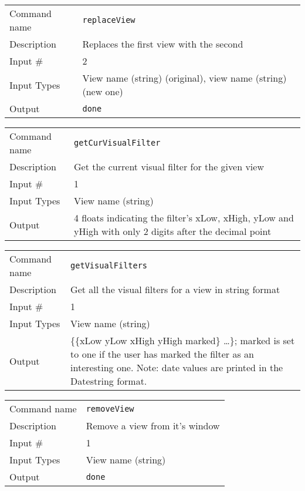\bigskip

\noindent
\begin{tabular}{l|p{5in}}
\hline
Command name & {\tt replaceView} \\
Description  & Replaces the first view with the second \\
Input \#     & 2 \\
Input Types  & View name (string) (original), view name (string) (new one) \\
Output       & {\tt done} \\
\hline
\end{tabular}

\bigskip

\noindent
\begin{tabular}{l|p{5in}}
\hline
Command name & {\tt getCurVisualFilter} \\
Description  & Get the current visual filter for the given view \\
Input \#     & 1 \\
Input Types  & View name (string) \\
Output       & 4 floats indicating the filter's xLow, xHigh, yLow and yHigh
               with only 2 digits after the decimal point \\
\hline
\end{tabular}

\bigskip

\noindent
\begin{tabular}{l|p{5in}}
\hline
Command name & {\tt getVisualFilters} \\
Description  & Get all the visual filters for a view in string format \\
Input \#     & 1 \\
Input Types  & View name (string) \\
Output       & \{\{xLow yLow xHigh yHigh marked\} \ldots \};
               marked is set to one if the user has marked the filter as
               an interesting one. Note: date values are printed in the
               Datestring format. \\
\hline
\end{tabular}

\bigskip

\noindent
\begin{tabular}{l|p{5in}}
\hline
Command name & {\tt removeView} \\
Description  & Remove a view from it's window \\
Input \#     & 1 \\
Input Types  & View name (string) \\
Output       & {\tt done} \\
\hline
\end{tabular}

